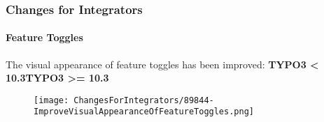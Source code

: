 
\begin{frame}[fragile]
	\frametitle{Changes for Integrators}
	\framesubtitle{Feature Toggles}

	The visual appearance of feature toggles has been improved:
	\newline\newline
	\smaller\textbf{TYPO3 < 10.3}\tabto{6cm}\textbf{TYPO3 >= 10.3}\normalsize

	\begin{figure}
		\texttt{[image: ChangesForIntegrators/89844-ImproveVisualAppearanceOfFeatureToggles.png]}
	\end{figure}

\end{frame}

%
%
%
%
%
%
%
